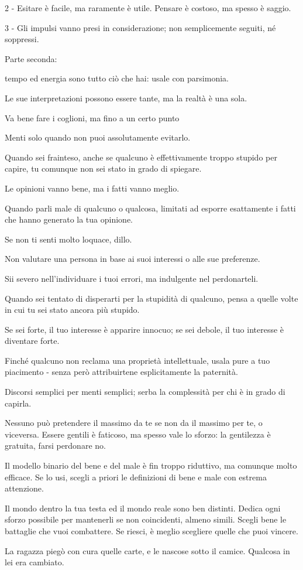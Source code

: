 2 - Esitare è facile, ma raramente è utile. Pensare è costoso, ma spesso è saggio.

3 - Gli impulsi vanno presi in considerazione; non semplicemente seguiti, né soppressi.

Parte seconda:

tempo ed energia sono tutto ciò che hai: usale con parsimonia.

Le sue interpretazioni possono essere tante, ma la realtà è una sola.

Va bene fare i coglioni, ma fino a un certo punto

Menti solo quando non puoi assolutamente evitarlo.

Quando sei frainteso, anche se qualcuno è effettivamente troppo stupido per capire, tu comunque non sei stato in grado di spiegare.

Le opinioni vanno bene, ma i fatti vanno meglio.

Quando parli male di qualcuno o qualcosa, limitati ad esporre esattamente i fatti che hanno generato la tua opinione.

Se non ti senti molto loquace, dillo.

Non valutare una persona in base ai suoi interessi o alle sue preferenze.

Sii severo nell’individuare i tuoi errori, ma indulgente nel perdonarteli.

Quando sei tentato di disperarti per la stupidità di qualcuno, pensa a quelle volte in cui tu sei stato ancora più stupido.

Se sei forte, il tuo interesse è apparire innocuo; se sei debole, il tuo interesse è diventare forte.

Finché qualcuno non reclama una proprietà intellettuale, usala pure a tuo piacimento - senza però attribuirtene esplicitamente la paternità.

Discorsi semplici per menti semplici; serba la complessità per chi è in grado di capirla.

Nessuno può pretendere il massimo da te se non da il massimo per te, o viceversa.
Essere gentili è faticoso, ma spesso vale lo sforzo: la gentilezza è gratuita, farsi perdonare no.

Il modello binario del bene e del male è fin troppo riduttivo, ma comunque molto efficace. Se lo usi, scegli a priori le definizioni di bene e male con estrema attenzione.

Il mondo dentro la tua testa ed il mondo reale sono ben distinti. Dedica ogni sforzo possibile per mantenerli se non coincidenti, almeno simili.
Scegli bene le battaglie che vuoi combattere. Se riesci, è meglio scegliere quelle che puoi vincere.

La ragazza piegò con cura quelle carte, e le nascose sotto il camice. Qualcosa in lei era cambiato.
